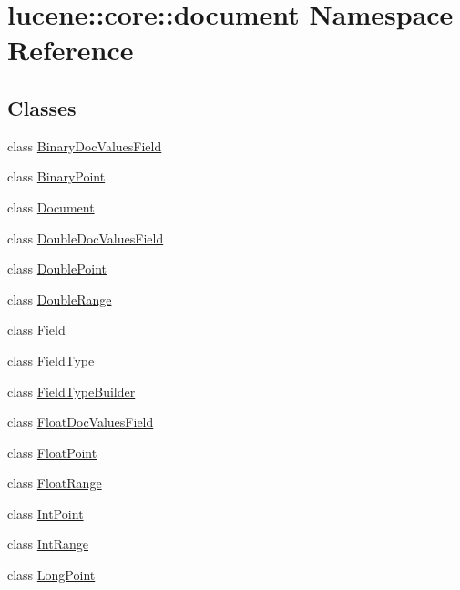\hypertarget{namespacelucene_1_1core_1_1document}{}\section{lucene\+:\+:core\+:\+:document Namespace Reference}
\label{namespacelucene_1_1core_1_1document}
\subsection*{Classes}
\begin{DoxyCompactItemize}
\item 
class \mbox{\hyperlink{classlucene_1_1core_1_1document_1_1BinaryDocValuesField}{Binary\+Doc\+Values\+Field}}
\item 
class \mbox{\hyperlink{classlucene_1_1core_1_1document_1_1BinaryPoint}{Binary\+Point}}
\item 
class \mbox{\hyperlink{classlucene_1_1core_1_1document_1_1Document}{Document}}
\item 
class \mbox{\hyperlink{classlucene_1_1core_1_1document_1_1DoubleDocValuesField}{Double\+Doc\+Values\+Field}}
\item 
class \mbox{\hyperlink{classlucene_1_1core_1_1document_1_1DoublePoint}{Double\+Point}}
\item 
class \mbox{\hyperlink{classlucene_1_1core_1_1document_1_1DoubleRange}{Double\+Range}}
\item 
class \mbox{\hyperlink{classlucene_1_1core_1_1document_1_1Field}{Field}}
\item 
class \mbox{\hyperlink{classlucene_1_1core_1_1document_1_1FieldType}{Field\+Type}}
\item 
class \mbox{\hyperlink{classlucene_1_1core_1_1document_1_1FieldTypeBuilder}{Field\+Type\+Builder}}
\item 
class \mbox{\hyperlink{classlucene_1_1core_1_1document_1_1FloatDocValuesField}{Float\+Doc\+Values\+Field}}
\item 
class \mbox{\hyperlink{classlucene_1_1core_1_1document_1_1FloatPoint}{Float\+Point}}
\item 
class \mbox{\hyperlink{classlucene_1_1core_1_1document_1_1FloatRange}{Float\+Range}}
\item 
class \mbox{\hyperlink{classlucene_1_1core_1_1document_1_1IntPoint}{Int\+Point}}
\item 
class \mbox{\hyperlink{classlucene_1_1core_1_1document_1_1IntRange}{Int\+Range}}
\item 
class \mbox{\hyperlink{classlucene_1_1core_1_1document_1_1LongPoint}{Long\+Point}}

\end{DoxyCompactItemize}
